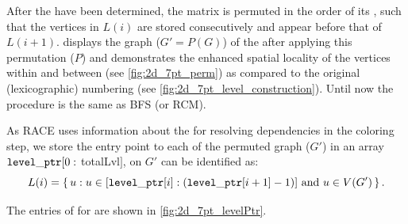 After the \levels have been determined, the matrix is permuted in the order of its \levels, such that the vertices in $L(i)$ are stored consecutively and appear before that of $L(i+1)$.  displays the graph ($G' = P(G)$) of the \stex after applying this permutation ($P$) and demonstrates the enhanced spatial locality of the vertices within and between \levels (see \cref{fig:2d_7pt_perm}) as compared to the original (lexicographic) numbering (see \cref{fig:2d_7pt_level_construction}).  Until now the procedure is the same as \acrshort{BFS} (or \acrshort{RCM}). 

As \acrshort{RACE} uses information about the \levels for resolving dependencies in the coloring step, we store the entry point to each \level of the permuted graph ($G'$) in an array ${\tt level\_ptr}[0:$ \acrshort{totalLvl}$]$, \ie \levels on $G'$ can be identified as:
\begin{equation*}
	L(i) = \set{ u : u \in [{\tt level\_ptr} [i]:({\tt level\_ptr} [i+1]-1)] \text{ and } u \in V(G')} .
\end{equation*}

The entries of \levelPtr for \stex are shown in \cref{fig:2d_7pt_levelPtr}. 
 
